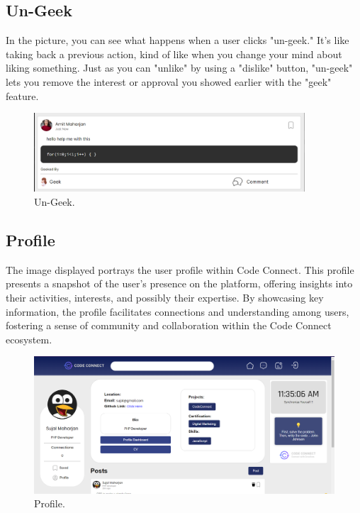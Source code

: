 \subsection{Un-Geek}
In the picture, you can see what happens when a user clicks "un-geek." It's like taking back a previous action, kind of like when you change your mind about liking something. Just as you can "unlike" by using a "dislike" button, "un-geek" lets you remove the interest or approval you showed earlier with the "geek" feature.
\begin{figure}[H]
    \centering
    \includegraphics[width=0.9\textwidth]{Outcome-ss/ungeek.png}
    \caption{Un-Geek.}
    \label{fig:Un-Geek}
\end{figure}

\subsection{Profile}
The image displayed portrays the user profile within Code Connect. This profile presents a snapshot of the user's presence on the platform, offering insights into their activities, interests, and possibly their expertise. By showcasing key information, the profile facilitates connections and understanding among users, fostering a sense of community and collaboration within the Code Connect ecosystem.
\begin{figure}[ht]
    \centering
    \includegraphics[width=1\textwidth]{Outcome-ss/self-profile.png}
    \caption{Profile.}
    \label{fig:Profile}
\end{figure}
\newpage
